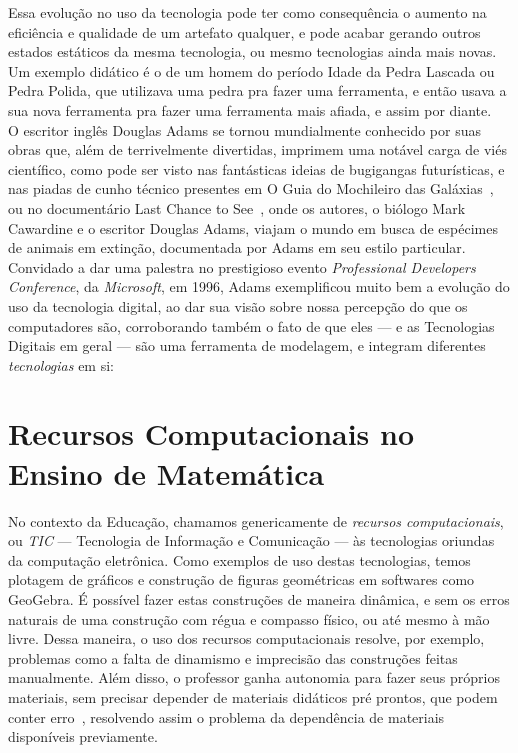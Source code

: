 Essa evolução no uso da tecnologia pode ter como consequência o aumento na eficiência e qualidade de um artefato qualquer, e pode acabar gerando outros estados estáticos da mesma tecnologia, ou mesmo tecnologias ainda mais novas. Um exemplo didático é o de um homem do período Idade da Pedra Lascada ou Pedra Polida, que utilizava uma pedra pra fazer uma ferramenta, e então usava a sua nova ferramenta pra fazer uma ferramenta mais afiada, e assim por diante.
\\


O escritor inglês Douglas Adams se tornou mundialmente conhecido por suas obras que, além de terrivelmente divertidas, imprimem uma notável carga de viés científico, como pode ser visto nas fantásticas ideias de bugigangas futurísticas, e nas piadas de cunho técnico presentes em O Guia do Mochileiro das Galáxias~\cite{adams2004guia}, ou no documentário Last Chance to See~\cite{adams2013last}, onde os autores, o biólogo Mark Cawardine e o escritor Douglas Adams, viajam o mundo em busca de espécimes de animais em extinção, documentada por Adams em seu estilo particular. Convidado a dar uma palestra no prestigioso evento \textit{Professional Developers Conference}, da \textit{Microsoft}, em 1996, Adams exemplificou muito bem a evolução do uso da tecnologia digital, ao dar sua visão sobre nossa percepção do que os computadores são, corroborando também o fato de que eles --- e as Tecnologias Digitais em geral --- são uma ferramenta de modelagem, e integram diferentes \textit{tecnologias} em si:
\\





\section{Recursos Computacionais no Ensino de Matemática}
No contexto da Educação, chamamos genericamente de \textit{recursos computacionais}, ou \textit{TIC} --- Tecnologia de Informação e Comunicação --- às tecnologias oriundas da computação eletrônica. Como exemplos de uso destas tecnologias, temos plotagem de gráficos e construção de figuras geométricas em softwares como GeoGebra. É possível fazer estas construções de maneira dinâmica, e sem os erros naturais de uma construção com régua e compasso físico, ou até mesmo à mão livre. Dessa maneira, o uso dos recursos computacionais resolve, por exemplo, problemas como a falta de dinamismo e imprecisão das construções feitas manualmente. Além disso, o professor ganha autonomia para fazer seus próprios materiais, sem precisar depender de materiais didáticos pré prontos, que podem conter erro~\cite{humberto-sbm}, resolvendo assim o problema da dependência de materiais disponíveis previamente. 


